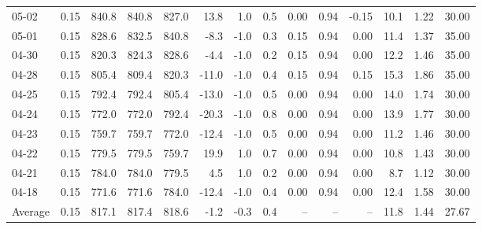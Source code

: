 \begin{threeparttable}
{\begin{tabular}{lrrrrrrrrrrrrr}
  05-02 &     0.15 & 840.8 & 840.8 & 827.0 &       13.8 &                      1.0 &                 0.5 &       0.00 &      0.94 &          -0.15 &             10.1 &            1.22 &                  30.00 \\
  05-01 &     0.15 & 828.6 & 832.5 & 840.8 &       -8.3 &                     -1.0 &                 0.3 &       0.15 &      0.94 &           0.00 &             11.4 &            1.37 &                  35.00 \\
  04-30 &     0.15 & 820.3 & 824.3 & 828.6 &       -4.4 &                     -1.0 &                 0.2 &       0.15 &      0.94 &           0.00 &             12.2 &            1.46 &                  35.00 \\
  04-28 &     0.15 & 805.4 & 809.4 & 820.3 &      -11.0 &                     -1.0 &                 0.4 &       0.15 &      0.94 &           0.15 &             15.3 &            1.86 &                  35.00 \\
  04-25 &     0.15 & 792.4 & 792.4 & 805.4 &      -13.0 &                     -1.0 &                 0.5 &       0.00 &      0.94 &           0.00 &             14.0 &            1.74 &                  30.00 \\
  04-24 &     0.15 & 772.0 & 772.0 & 792.4 &      -20.3 &                     -1.0 &                 0.8 &       0.00 &      0.94 &           0.00 &             13.9 &            1.77 &                  30.00 \\
  04-23 &     0.15 & 759.7 & 759.7 & 772.0 &      -12.4 &                     -1.0 &                 0.5 &       0.00 &      0.94 &           0.00 &             11.2 &            1.46 &                  30.00 \\
  04-22 &     0.15 & 779.5 & 779.5 & 759.7 &       19.9 &                      1.0 &                 0.7 &       0.00 &      0.94 &           0.00 &             10.8 &            1.43 &                  30.00 \\
  04-21 &     0.15 & 784.0 & 784.0 & 779.5 &        4.5 &                      1.0 &                 0.2 &       0.00 &      0.94 &           0.00 &              8.7 &            1.12 &                  30.00 \\
  04-18 &     0.15 & 771.6 & 771.6 & 784.0 &      -12.4 &                     -1.0 &                 0.4 &       0.00 &      0.94 &           0.00 &             12.4 &            1.58 &                  30.00 \\
Average &     0.15 & 817.1 & 817.4 & 818.6 &       -1.2 &                     -0.3 &                 0.4 &         -- &        -- &             -- &             11.8 &            1.44 &                  27.67 \\

\end{tabular}}
\end{threeparttable}
